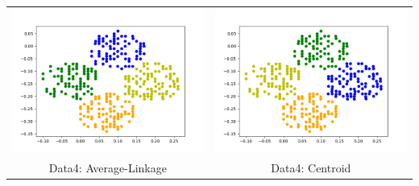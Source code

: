 \documentclass{article}
\begin{document}
\begin{tabular}{c|c}
\includegraphics[scale=0.4]{hac_images/data4average.png}&\includegraphics[scale=0.4]{hac_images/data4centroid.png}\\
{Data4: Average-Linkage}&{Data4: Centroid}\\


\end{tabular}
\end{document}
